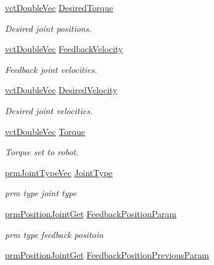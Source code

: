 \begin{DoxyCompactItemize}
\hyperlink{vct_dynamic_vector_types_8h_ade4b3068c86fb88f41af2e5187e491c2}{vct\-Double\-Vec} \hyperlink{classmts_p_i_d_a7756c43c46391cfc929a46c0e99b12a0}{Desired\-Torque}
\begin{DoxyCompactList}\small\item\em Desired joint positions. \end{DoxyCompactList}\item 
\hyperlink{vct_dynamic_vector_types_8h_ade4b3068c86fb88f41af2e5187e491c2}{vct\-Double\-Vec} \hyperlink{classmts_p_i_d_ad881aba30dc205f26ce1ce69763bf9a6}{Feedback\-Velocity}
\begin{DoxyCompactList}\small\item\em Feedback joint velocities. \end{DoxyCompactList}\item 
\hyperlink{vct_dynamic_vector_types_8h_ade4b3068c86fb88f41af2e5187e491c2}{vct\-Double\-Vec} \hyperlink{classmts_p_i_d_aacc1516bf1b22d2c0e0b184fe7928b42}{Desired\-Velocity}
\begin{DoxyCompactList}\small\item\em Desired joint velocities. \end{DoxyCompactList}\item 
\hyperlink{vct_dynamic_vector_types_8h_ade4b3068c86fb88f41af2e5187e491c2}{vct\-Double\-Vec} \hyperlink{classmts_p_i_d_a928a19f9bc0b311ec5743a108b2f8534}{Torque}
\begin{DoxyCompactList}\small\item\em Torque set to robot. \end{DoxyCompactList}\item 
\hyperlink{prm_joint_type_8h_a3a21392b4484e2e24aa0b73d553f940e}{prm\-Joint\-Type\-Vec} \hyperlink{classmts_p_i_d_ae108b12c62723774cee553f7e76213f6}{Joint\-Type}
\begin{DoxyCompactList}\small\item\em prm type joint type \end{DoxyCompactList}\item 
\hyperlink{classprm_position_joint_get}{prm\-Position\-Joint\-Get} \hyperlink{classmts_p_i_d_ab504e84dce2591651f13dde667e34497}{Feedback\-Position\-Param}
\begin{DoxyCompactList}\small\item\em prm type feedback positoin \end{DoxyCompactList}\item 
\hyperlink{classprm_position_joint_get}{prm\-Position\-Joint\-Get} \hyperlink{classmts_p_i_d_a28b48c75d2a18ae085e903a4d2668527}{Feedback\-Position\-Previous\-Param}

\end{DoxyCompactItemize}
